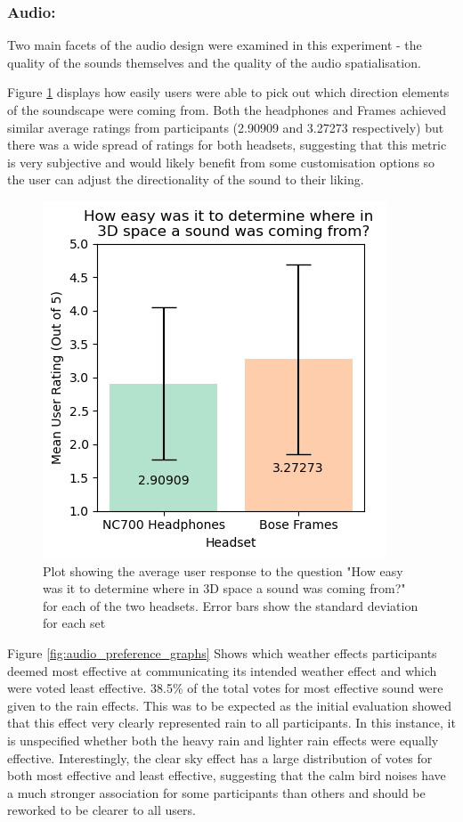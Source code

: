 \documentclass{l4proj}
\begin{document}
\subsubsection{Audio: }

Two main facets of the audio design were examined in this experiment - the quality of the sounds themselves and the quality of the audio spatialisation.

Figure \ref{fig:audio_tracking_graph} displays how easily users were able to pick out which direction elements of the soundscape were coming from. Both the headphones and Frames achieved similar average ratings from participants (\num{2.90909} and \num{3.27273} respectively) but there was a wide spread of ratings for both headsets, suggesting that this metric is very subjective and would likely benefit from some customisation options so the user can adjust the directionality of the sound to their liking.

\begin{figure}[h!]
    \centering
    \includegraphics{images/graphs/audio_detection_small.png}
    \caption{Plot showing the average user response to the question "How easy was it to determine where in 3D space a sound was coming from?" for each of the two headsets. Error bars show the standard deviation for each set}
    \label{fig:audio_tracking_graph}
\end{figure}

Figure \ref{fig:audio_preference_graphs} Shows which weather effects participants deemed most effective at communicating its intended weather effect and which were voted least effective.
38.5\% of the total votes for most effective sound were given to the rain effects. This was to be expected as the initial evaluation showed that this effect very clearly represented rain to all participants. In this instance, it is unspecified whether both the heavy rain and lighter rain effects were equally effective.
Interestingly, the clear sky effect has a large distribution of votes for both most effective and least effective, suggesting that the calm bird noises have a much stronger association for some participants than others and should be reworked to be clearer to all users.
\end{document}
